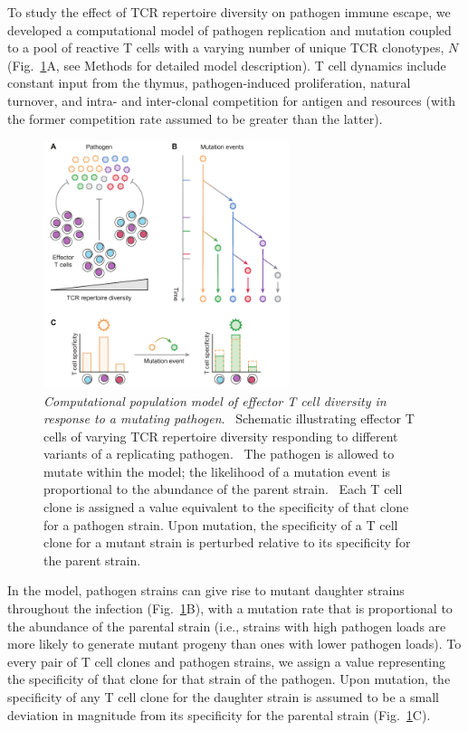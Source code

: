 To study the effect of TCR repertoire diversity on pathogen immune escape, we developed a computational model of pathogen replication and mutation coupled to a pool of reactive T cells with a varying number of unique TCR clonotypes, $N$ (Fig.~\ref{fig:VE_scheme}A, see Methods for detailed model description). T cell dynamics include constant input from the thymus, pathogen-induced proliferation, natural turnover, and intra- and inter-clonal competition for antigen and resources (with the former competition rate assumed to be greater than the latter).%
%
\begin{figure}[tb]
    \centering
    \includegraphics[width=0.64\textwidth]{Figures/VE/fig1_scheme.pdf}
    \caption[Computational population model of effector T cell diversity in response to a mutating pathogen]{\textit{Computational population model of effector T cell diversity in response to a mutating pathogen}. %
    ~Schematic illustrating effector T cells of varying TCR repertoire diversity responding to different variants of a replicating pathogen. %
    ~The pathogen is allowed to mutate within the model; the likelihood of a mutation event is proportional to the abundance of the parent strain. %
    ~Each T cell clone is assigned a value equivalent to the specificity of that clone for a pathogen strain. Upon mutation, the specificity of a T cell clone for a mutant strain is perturbed relative to its specificity for the parent strain.}
    \label{fig:VE_scheme}
\end{figure}
%
In the model, pathogen strains can give rise to mutant daughter strains throughout the infection (Fig.~\ref{fig:VE_scheme}B), with a mutation rate that is proportional to the abundance of the parental strain (i.e., strains with high pathogen loads are more likely to generate mutant progeny than ones with lower pathogen loads). To every pair of T cell clones and pathogen strains, we assign a value representing the specificity of that clone for that strain of the pathogen. Upon mutation, the specificity of any T cell clone for the daughter strain is assumed to be a small deviation in magnitude from its specificity for the parental strain (Fig.~\ref{fig:VE_scheme}C).

